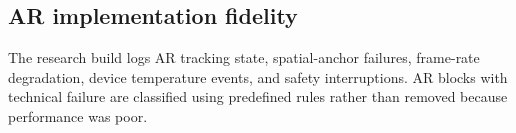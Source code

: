 \subsection{AR implementation fidelity}

The research build logs AR tracking state, spatial-anchor failures, frame-rate degradation, device temperature events, and safety interruptions. AR blocks with technical failure are classified using predefined rules rather than removed because performance was poor.
